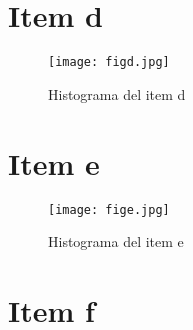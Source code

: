 \documentclass{article}
\begin{document}
\section{Item d}
\begin{figure}
\centering
\texttt{[image: figd.jpg]}
\caption[]{Histograma del item d}
\label{fig:itemd}
\end{figure}

\section{Item e}
\begin{figure}
\centering
\texttt{[image: fige.jpg]}
\caption[]{Histograma del item e}
\label{fig:iteme}
\end{figure}

\section{Item f}
\end{document}
